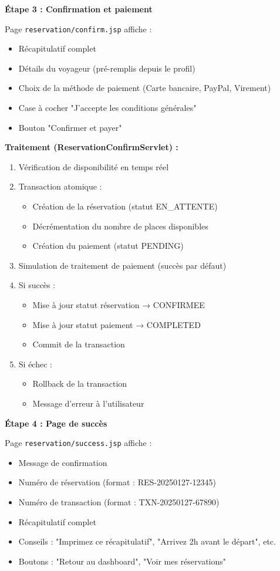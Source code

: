 \documentclass[12pt,a4paper]{report}
\begin{document}
\textbf{Étape 3 : Confirmation et paiement}

Page \texttt{reservation/confirm.jsp} affiche :
\begin{itemize}
    \item Récapitulatif complet
    \item Détails du voyageur (pré-remplis depuis le profil)
    \item Choix de la méthode de paiement (Carte bancaire, PayPal, Virement)
    \item Case à cocher "J'accepte les conditions générales"
    \item Bouton "Confirmer et payer"
\end{itemize}

\textbf{Traitement (ReservationConfirmServlet) :}
\begin{enumerate}
    \item Vérification de disponibilité en temps réel
    \item Transaction atomique :
    \begin{itemize}
        \item Création de la réservation (statut EN\_ATTENTE)
        \item Décrémentation du nombre de places disponibles
        \item Création du paiement (statut PENDING)
    \end{itemize}
    \item Simulation de traitement de paiement (succès par défaut)
    \item Si succès :
    \begin{itemize}
        \item Mise à jour statut réservation → CONFIRMEE
        \item Mise à jour statut paiement → COMPLETED
        \item Commit de la transaction
    \end{itemize}
    \item Si échec :
    \begin{itemize}
        \item Rollback de la transaction
        \item Message d'erreur à l'utilisateur
    \end{itemize}
\end{enumerate}

\textbf{Étape 4 : Page de succès}

Page \texttt{reservation/success.jsp} affiche :
\begin{itemize}
    \item Message de confirmation
    \item Numéro de réservation (format : RES-20250127-12345)
    \item Numéro de transaction (format : TXN-20250127-67890)
    \item Récapitulatif complet
    \item Conseils : "Imprimez ce récapitulatif", "Arrivez 2h avant le départ", etc.
    \item Boutons : "Retour au dashboard", "Voir mes réservations"
\end{itemize}
\end{document}
